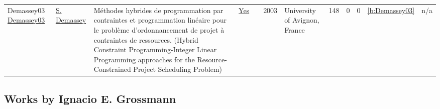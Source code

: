 {\begin{longtable}{>{\raggedright\arraybackslash}p{3cm}>{\raggedright\arraybackslash}p{6cm}>{\raggedright\arraybackslash}p{6.5cm}rrrp{2.5cm}rrrrr}
Demassey03 \href{https://tel.archives-ouvertes.fr/tel-00293564}{Demassey03} & \hyperref[auth:a246]{S. Demassey} & M{\'{e}}thodes hybrides de programmation par contraintes et programmation lin{\'{e}}aire pour le probl{\`{e}}me d'ordonnancement de projet {\`{a}} contraintes de ressources. (Hybrid Constraint Programming-Integer Linear Programming approaches for the Resource-Constrained Project Scheduling Problem) & \href{works/Demassey03.pdf}{Yes} & \cite{Demassey03} & 2003 & University of Avignon, France & 148 & 0 & 0 & \ref{b:Demassey03} & n/a\\
\end{longtable}
}

\subsection{Works by Ignacio E. Grossmann}
\label{sec:a388}
